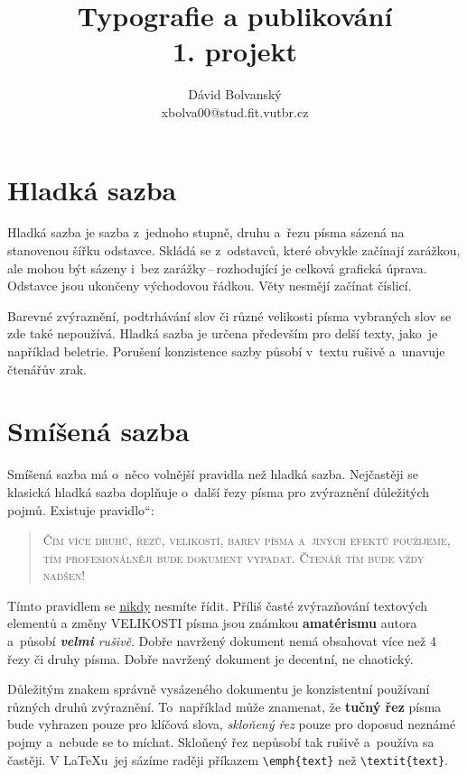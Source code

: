 \documentclass[a4paper,11pt,twocolumn]{article}[7.3.2016]
\title{Typografie a publikování\\1. projekt}
\author{Dávid Bolvanský\\xbolva00@stud.fit.vutbr.cz}
\date{}
\providecommand{\uv}[1]{\quotedblbase #1\textquotedblleft}
\begin{document}
\maketitle
	
\section{Hladká sazba}
Hladká sazba je sazba z~jednoho stupně, druhu a~řezu písma sázená na stanovenou šířku odstavce. Skládá se z~odstavců, které obvykle začínají zarážkou, ale mohou být sázeny i~bez zarážky\,--\,rozhodující je celková grafická úprava. Odstavce jsou ukončeny východovou řádkou. Věty nesmějí začínat číslicí.
	
Barevné zvýraznění, podtrhávání slov či různé velikosti písma vybraných slov se zde také nepoužívá. Hladká sazba je určena především pro delší texty, jako~je například beletrie. Porušení konzistence sazby působí v~textu rušivě a~unavuje čtenářův zrak.
	
\section{Smíšená sazba}
Smíšená sazba má o~něco volnější pravidla než hladká sazba. Nejčastěji se klasická hladká sazba doplňuje o~další řezy písma pro zvýraznění důležitých pojmů. Existuje \uv{pravidlo}:

\begin{quotation}
\textsc {Čím více druhů, řezů, velikostí, barev písma a~jiných efektů použije\-me, tím profesionálněji bude dokument vypadat. Čtenář tím bude vždy nadšen!}	
\end{quotation}

Tímto pravidlem se \underline{nikdy} nesmíte řídit. Příliš časté zvýrazňování textových elementů a změny {\huge V}{\LARGE E}{\Large L}{\large I}{\normalsize K}{\small O}{\footnotesize S}{\scriptsize T}{\tiny I} písma {\Large jsou} {\LARGE známkou}  {\huge\bfseries ama\-té\-ris\-mu} autora a~působí \textit{{\textbf{velmi}} rušivě}. Dobře navržený dokument nemá obsahovat více než 4 řezy či druhy písma. {\ttfamily Dobře navržený dokument je decentní, ne chaotický.}
	
Důležitým znakem správně vysázeného dokumentu je konzistentní používaní různých druhů zvýraznění. To~například může znamenat, že \textbf{tučný řez} písma bude vyhrazen pouze pro klíčová slova, \emph{skloňený řez} pouze pro doposud neznámé pojmy a~nebude se to míchat. Skloňený řez nepůsobí tak rušivě a~používa sa častěji. V \LaTeX u~jej sázíme raději příkazem \verb|\emph{text}| než \verb|\textit{text}|.
	
\end{document}
